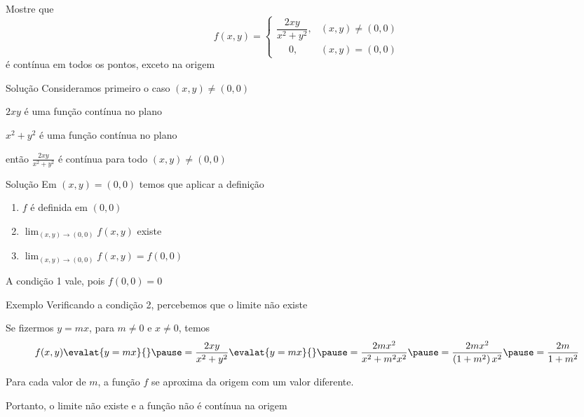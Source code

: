 \documentclass[fleqn,utf8,aspectratio=169,12pt]{beamer}
\begin{document}
\begin{question}
  Mostre que
  \[
    f(x, y) =
    \begin{cases}
      \dfrac{2xy}{x^2+y^2}, & (x, y) \neq (0, 0) \\
      \quad\; 0,            & (x, y) =    (0, 0)
    \end{cases}
  \]
  é contínua em todos os pontos, exceto na origem
\end{question}

\begin{resolution}{Solução}
  Consideramos primeiro o caso \((x, y) \neq (0, 0)\)

  \pause
  \vspace{\baselineskip}
  \(2xy\) é uma função contínua no plano

  \pause
  \(x^2+y^2\) é uma função contínua no plano

  \pause
  então \(\frac{2xy}{x^2+y^2}\)
  \pause
  é contínua para todo \((x, y) \neq (0, 0)\)
\end{resolution}

\begin{resolution}{Solução}
  Em \((x, y) = (0, 0)\) temos que aplicar a definição

  \pause
  \vspace{0.5\baselineskip}
  \begin{enumerate}
    \setlength\itemsep{1.5em}
    \item \(f\) é definida em \((0, 0)\)
    \item \(\lim_{(x, y)\to(0, 0)} f(x, y)\) existe
    \item \(\lim_{(x, y)\to(0, 0)} f(x, y) = f(0, 0)\)
  \end{enumerate}

  \pause
  \vspace{\baselineskip}
  A condição 1 vale, pois \(f(0, 0) = 0\)
\end{resolution}

\begin{frame}{Exemplo \theexemplo}
  Verificando a condição 2, percebemos que o limite não existe

  \pause
  Se fizermos \(y=mx\),
  \pause
  para \(m\neq 0\) e \(x\neq 0\), temos
  \pause
  \[
    f(x, y)\evalat{y=mx}{}
    \pause
    = \frac{2xy}{x^2+y^2}\evalat{y=mx}{}
    \pause
    = \frac{2mx^2}{x^2+m^2x^2}
    \pause
    = \frac{2mx^2}{\left(1+m^2\right)x^2}
    \pause
    = \frac{2m}{1+m^2}
  \]

  \pause
  Para cada valor de $m$, a função $f$ se aproxima da origem com um valor diferente.

  \pause
  Portanto, o limite não existe e a função não é contínua na origem
\end{frame}
\end{document}
